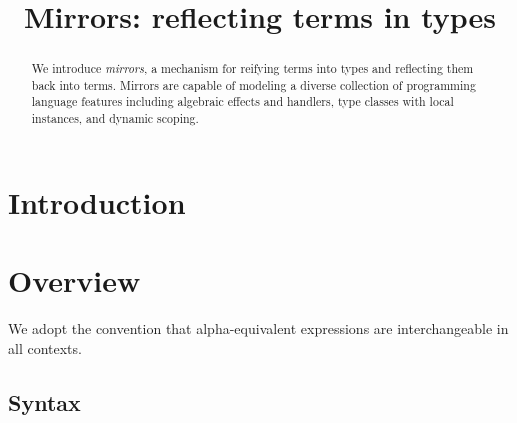 \documentclass[12pt]{article}
\title{Mirrors: reflecting terms in types}
\date{}
\begin{document}
  \maketitle

  \begin{abstract}
    We introduce \emph{mirrors}, a mechanism for reifying terms into types and reflecting them back into terms. Mirrors are capable of modeling a diverse collection of programming language features including algebraic effects and handlers, type classes with local instances, and dynamic scoping.
  \end{abstract}

  \section{Introduction}

    \iffalse
      \begin{lstlisting}[gobble=4]
        mirror IO over String ! { } in
          reify "Hello" as a => IO in
            do x <- reflect a => IO in
              x + ", World!"
      \end{lstlisting}
    \fi

  \section{Overview}

    We adopt the convention that alpha-equivalent expressions are interchangeable in all contexts.

    \subsection{Syntax}
\end{document}

